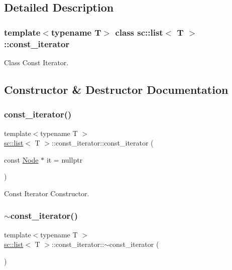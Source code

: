 \subsection{Detailed Description}
\subsubsection*{template$<$typename T$>$\newline
class sc\+::list$<$ T $>$\+::const\+\_\+iterator}

Class Const Iterator. 

\subsection{Constructor \& Destructor Documentation}
\mbox{\label{classsc_1_1list_1_1const__iterator_a753ed04268e9dd2cea38a765eff349d2}} 
\subsubsection{\texorpdfstring{const\+\_\+iterator()}{const\_iterator()}}
{\footnotesize\ttfamily template$<$typename T $>$ \\
\hyperlink{classsc_1_1list}{sc\+::list}$<$ T $>$\+::const\+\_\+iterator\+::const\+\_\+iterator (\begin{DoxyParamCaption}\item[{const \hyperlink{structsc_1_1list_1_1_node}{Node} $\ast$}]{it = {\ttfamily nullptr} }\end{DoxyParamCaption})\hspace{0.3cm}{\ttfamily [inline]}}



Const Iterator Constructor. 

\mbox{\label{classsc_1_1list_1_1const__iterator_a8ef9a290e31090f1366403626bdbab1c}} 
\subsubsection{\texorpdfstring{$\sim$const\+\_\+iterator()}{~const\_iterator()}}
{\footnotesize\ttfamily template$<$typename T $>$ \\
\hyperlink{classsc_1_1list}{sc\+::list}$<$ T $>$\+::const\+\_\+iterator\+::$\sim$const\+\_\+iterator (\begin{DoxyParamCaption}{ }\end{DoxyParamCaption})\hspace{0.3cm}{\ttfamily [inline]}}




